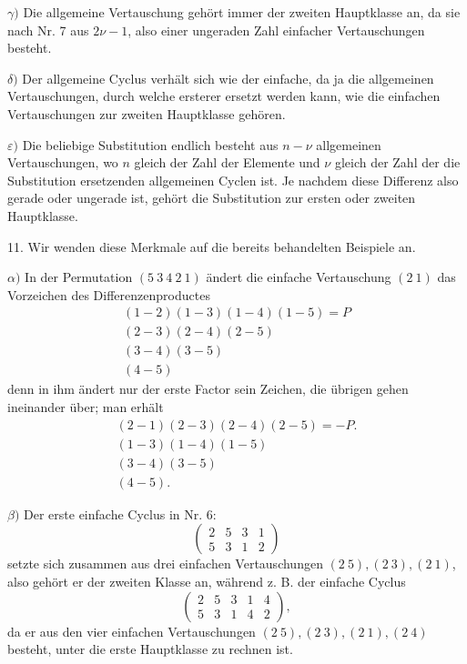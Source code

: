 \documentclass[10pt]{article}
\begin{document}
\(\gamma)\) Die allgemeine Vertauschung gehört immer der zweiten Hauptklasse an, da sie nach Nr. 7 aus \(2\nu-1\), also einer ungeraden Zahl einfacher Vertauschungen besteht.

\(\delta)\) Der allgemeine Cyclus verhält sich wie der einfache, da ja die allgemeinen Vertauschungen, durch welche ersterer ersetzt werden kann, wie die einfachen Vertauschungen zur zweiten Hauptklasse gehören.

\(\varepsilon)\) Die beliebige Substitution endlich besteht aus \(n-\nu\) allgemeinen Vertauschungen, wo \(n\) gleich der Zahl der Elemente und \(\nu\) gleich der Zahl der die Substitution ersetzenden allgemeinen Cyclen ist. Je nachdem diese Differenz also gerade oder ungerade ist, gehört die Substitution zur ersten oder zweiten Hauptklasse.

11. Wir wenden diese Merkmale auf die bereits behandelten Beispiele an.

\(\alpha)\) In der Permutation \((5\ 3\ 4\ 2\ 1)\) ändert die einfache Vertauschung \((2\ 1)\) das Vorzeichen des Differenzenproductes
\[
\begin{gathered}
(1-2)(1-3)(1-4)(1-5)=P\\
(2-3)(2-4)(2-5)\\
(3-4)(3-5)\\
(4-5)
\end{gathered}
\]
denn in ihm ändert nur der erste Factor sein Zeichen, die übrigen gehen ineinander über; man erhält
\[
\begin{gathered}
(2-1)(2-3)(2-4)(2-5)=-P.\\
(1-3)(1-4)(1-5)\\
(3-4)(3-5)\\
(4-5).
\end{gathered}
\]

\(\beta)\) Der erste einfache Cyclus in Nr. 6:
\[
\begin{pmatrix}2&5&3&1\\5&3&1&2\end{pmatrix}
\]
setzte sich zusammen aus drei einfachen Vertauschungen \((2\ 5),(2\ 3),(2\ 1)\), also gehört er der zweiten Klasse an, während z. B. der einfache Cyclus
\[
\begin{pmatrix}2&5&3&1&4\\5&3&1&4&2\end{pmatrix},
\]
da er aus den vier einfachen Vertauschungen \((2\ 5),(2\ 3),(2\ 1),(2\ 4)\) besteht, unter die erste Hauptklasse zu rechnen ist.
\end{document}
